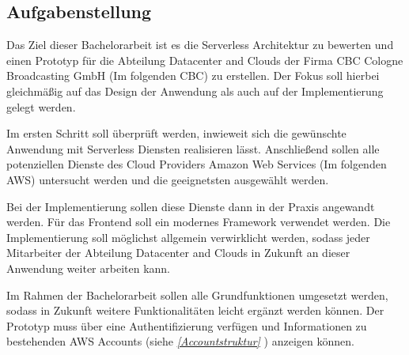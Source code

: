 \subsection{Aufgabenstellung}

Das Ziel dieser Bachelorarbeit ist es die Serverless Architektur zu bewerten und einen Prototyp für die Abteilung Datacenter and Clouds der Firma CBC Cologne Broadcasting GmbH (Im folgenden \glqq CBC\grqq) zu erstellen.
Der Fokus soll hierbei gleichmäßig auf das Design der Anwendung als auch auf der Implementierung gelegt werden.

Im ersten Schritt soll überprüft werden, inwieweit sich die gewünschte Anwendung mit Serverless Diensten realisieren lässt.
Anschließend sollen alle potenziellen Dienste des Cloud Providers Amazon Web Services (Im folgenden \glqq AWS\grqq) untersucht werden und die geeignetsten ausgewählt werden.

Bei der Implementierung sollen diese Dienste dann in der Praxis angewandt werden. Für das Frontend soll ein modernes Framework verwendet werden.
Die Implementierung soll möglichst allgemein verwirklicht werden, sodass jeder Mitarbeiter der Abteilung Datacenter and Clouds in Zukunft an dieser Anwendung weiter arbeiten kann.

Im Rahmen der Bachelorarbeit sollen alle Grundfunktionen umgesetzt werden, sodass in Zukunft weitere Funktionalitäten leicht ergänzt werden können.
Der Prototyp muss über eine Authentifizierung verfügen und Informationen zu bestehenden AWS Accounts (siehe \textit{\ref{Accountstruktur} }) anzeigen können.

